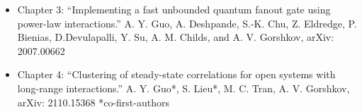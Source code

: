 \begin{itemize}
    \item Chapter 3: ``Implementing a fast unbounded quantum fanout gate using power-law interactions.'' A. Y. Guo, A. Deshpande, S.-K. Chu, Z. Eldredge, P. Bienias, D.Devulapalli, Y. Su, A. M. Childs, and A. V. Gorshkov, arXiv: 2007.00662

    \item Chapter 4: ``Clustering of steady-state correlations for open systems with long-range interactions.'' A. Y. Guo*, S. Lieu*, M. C. Tran, A. V. Gorshkov, arXiv: 2110.15368 *co-first-authors
\end{itemize}
%
%
%
%
%
